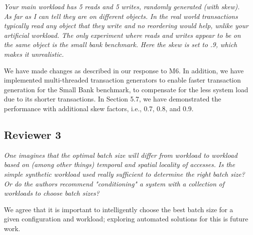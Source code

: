 \documentclass{article}
\begin{document}
\emph{Your main workload has 5 reads and 5 writes, randomly generated (with skew). As far as I can tell they are on different objects. In the real world transactions typically read any object that they write and no reordering would help, unlike your artificial workload. The only experiment where reads and writes appear to be on the same object is the small bank benchmark. Here the skew is set to .9, which makes it unrealistic. }

We have made changes as described in our response to M6. In addition, we have implemented multi-threaded transaction generators to enable faster transaction generation for the Small Bank benchmark, to compensate for the less system load due to its shorter transactions. In Section 5.7, we have demonstrated the performance with additional skew factors, i.e., 0.7, 0.8, and 0.9.

\subsection{Reviewer 3}

\emph{One imagines that the optimal batch size will differ from workload to workload based on (among other things) temporal and spatial locality of accesses. Is the simple synthetic workload used really sufficient to determine the right batch size? Or do the authors recommend "conditioning" a system with a collection of workloads to choose batch sizes?}

We agree that it is important to intelligently choose the best batch size for a given configuration and workload; exploring automated solutions for this is future work.
\end{document}
